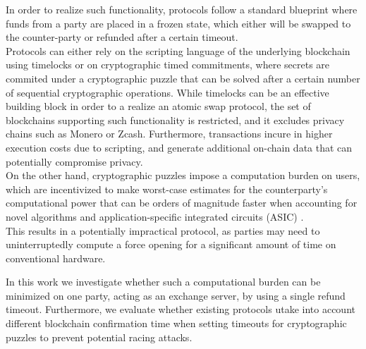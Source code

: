 \documentclass{article}      	%
\begin{document}
In order to realize such functionality, protocols follow a standard blueprint where funds from a party are placed in a frozen state, which either will be swapped to the counter-party or refunded after a certain timeout. \\
Protocols can either rely on the scripting language of the underlying blockchain using timelocks or on cryptographic timed commitments, where secrets are commited under a cryptographic puzzle that can be solved after a certain number of sequential cryptographic operations. 
While timelocks can be an effective building block in order to a realize an atomic swap protocol, the set of blockchains supporting such functionality is restricted, and it excludes privacy chains such as Monero or Zcash. Furthermore, transactions incure in higher execution costs due to scripting, and generate additional on-chain data that can potentially compromise privacy. \\
On the other hand, cryptographic puzzles impose a computation burden on users, which are incentivized to make worst-case estimates for the counterparty's computational power that can be orders of magnitude faster when accounting for novel algorithms \cite{squaring_algo} and application-specific integrated circuits (ASIC) \cite{squaring_asic}. \\
This results in a potentially impractical protocol, as parties may need to uninterruptedly compute a force opening for a significant amount of time on conventional hardware.

In this work we investigate whether such a computational burden can be minimized on one party, acting as an exchange server, by using a single refund timeout. Furthermore, we evaluate whether existing protocols utake into account different blockchain confirmation time when setting timeouts for cryptographic puzzles to prevent potential racing attacks.
\end{document}
